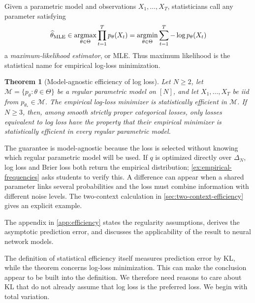 \documentclass[11pt,twoside]{article}
\newtheorem{theorem}{Theorem}[section]
\theoremstyle{definition}
\theoremstyle{remark}
\begin{document}
Given a parametric model and observations $X_1,\ldots,X_T$, statisticians call
any parameter satisfying
\begin{equation}
\widehat\theta_{\rm MLE}
\in\mathop{\rm argmax}_{\theta\in\Theta}
\prod_{t=1}^T p_\theta(X_t)
=\mathop{\rm argmin}_{\theta\in\Theta}
\sum_{t=1}^T-\log p_\theta(X_t)
\label{eq:mle-definition}
\end{equation}
a \emph{maximum-likelihood estimator}, or MLE. Thus maximum likelihood is the
statistical name for empirical log-loss minimization.

\begin{theorem}[Model-agnostic efficiency of log loss]
\label{thm:model-agnostic-efficiency}
Let $N\ge2$, let $\mathcal M=\{p_\theta:\theta\in\Theta\}$ be a regular
parametric model on $[N]$, and let $X_1,\ldots,X_T$ be iid from
$p_{\theta_*}\in\mathcal M$. The empirical log-loss minimizer is statistically
efficient in $\mathcal M$. If $N\ge3$, then, among smooth strictly proper
categorical losses, only losses equivalent to log loss have the property that
their empirical minimizer is statistically efficient in every regular
parametric model.
\end{theorem}

The guarantee is model-agnostic because the loss is selected without knowing
which regular parametric model will be used. If $q$ is optimized directly over
$\Delta_N$, log loss and Brier loss both return the empirical distribution;
\cref{ex:empirical-frequencies} asks students to verify this. A difference can
appear when a shared parameter links several probabilities and the loss must
combine information with different noise levels. The two-context calculation
in \cref{sec:two-context-efficiency} gives an explicit example.

The appendix in \cref{app:efficiency} states the regularity assumptions,
derives the asymptotic prediction error, and discusses the applicability of the
result to neural network models.

The definition of statistical efficiency itself measures prediction error by
KL, while the theorem concerns log-loss minimization. This can make the
conclusion appear to be built into the definition. We therefore need reasons
to care about KL that do not already assume that log loss is the preferred
loss. We begin with total variation.
\end{document}
